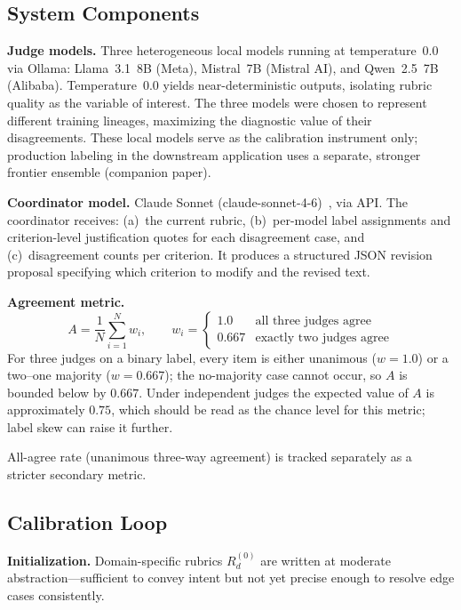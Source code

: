 \documentclass[11pt]{article}
\begin{document}
\subsection{System Components}

\textbf{Judge models.} Three heterogeneous local models running at
temperature~0.0 via Ollama: Llama~3.1~8B (Meta), Mistral~7B (Mistral AI), and
Qwen~2.5~7B (Alibaba). Temperature~0.0 yields near-deterministic outputs, isolating
rubric quality as the variable of interest. The three models were chosen to
represent different training lineages, maximizing the diagnostic value of their
disagreements.
These local models serve as the calibration instrument only; production labeling in the
downstream application uses a separate, stronger frontier ensemble (companion paper).

\textbf{Coordinator model.} Claude Sonnet (claude-sonnet-4-6)~\cite{anthropicClaudeSonnet46}, via API. The
coordinator receives: (a)~the current rubric, (b)~per-model label assignments
and criterion-level justification quotes for each disagreement case, and
(c)~disagreement counts per criterion. It produces a structured JSON revision
proposal specifying which criterion to modify and the revised text.

\textbf{Agreement metric.}
\begin{equation}
\label{eq:agreement}
  A = \frac{1}{N} \sum_{i=1}^{N} w_i, \qquad
  w_i = \begin{cases}
    1.0   & \text{all three judges agree} \\
    0.667 & \text{exactly two judges agree}
  \end{cases}
\end{equation}
For three judges on a binary label, every item is either unanimous ($w=1.0$) or a
two--one majority ($w=0.667$); the no-majority case cannot occur, so $A$ is bounded below
by $0.667$. Under independent judges the expected value of $A$ is approximately $0.75$,
which should be read as the chance level for this metric; label skew can raise it further.

All-agree rate (unanimous three-way agreement) is tracked separately as a
stricter secondary metric.

\subsection{Calibration Loop}
\label{sec:calibrationloop}

\textbf{Initialization.} Domain-specific rubrics $R_d^{(0)}$ are written at
moderate abstraction---sufficient to convey intent but not yet precise enough
to resolve edge cases consistently.
\end{document}
